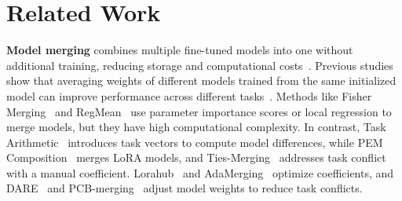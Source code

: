 \section{Related Work}

\textbf{Model merging} combines multiple fine-tuned models into one without additional training, reducing storage and computational costs~\cite{jiang2024cade, ma2024decouple,guodong24neurips,huang2024emr}. Previous studies show that averaging weights of different models trained from the same initialized model can improve performance across different tasks~\cite{gupta2020stochastic, wortsman2022model, ilharco2022patching, arpit2022ensemble, rame2022diverse}. 
Methods like Fisher Merging~\cite{matena2022merging} and RegMean~\cite{jin2023regmean} use parameter importance scores or local regression to merge models, but they have high computational complexity.
In contrast, Task Arithmetic~\cite{ilharco2022editing} introduces task vectors to compute model differences, while PEM Composition~\cite{zhang2023composing} merges LoRA models, and Ties-Merging~\cite{ties} addresses task conflict with a manual coefficient. Lorahub~\cite{huang2023lorahub} and AdaMerging~\cite{yang2023adamerging} optimize coefficients, and DARE~\cite{yu2023language} and PCB-merging~\cite{pcbmerging} adjust model weights to reduce task conflicts.



